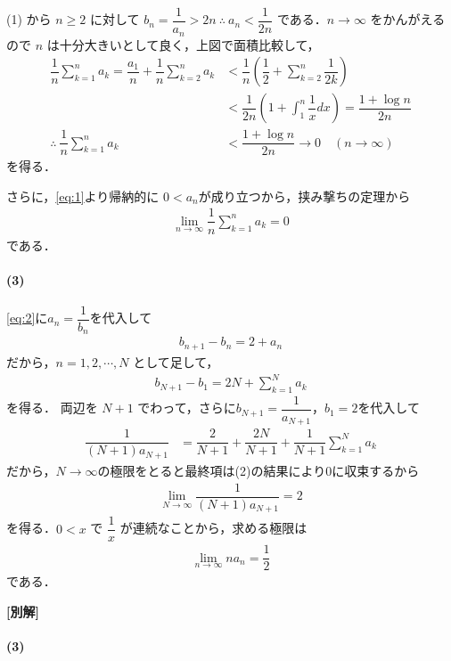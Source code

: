 \documentclass[../../main.tex]{subfiles}
\begin{document}
(1) から $n \ge 2$ に対して $b_n=\dfrac{1}{a_n} > 2n \ \therefore \ a_n < \dfrac{1}{2n}$ である．$n \to \infty$ をかんがえるので $n$ は十分大きいとして良く，上図で面積比較して，
\begin{align}
  \dfrac{1}{n} \sum_{k=1}^n a_k
  = \dfrac{a_1}{n} + \dfrac{1}{n} \sum_{k=2}^n a_k
  &< \dfrac{1}{n} \left( \dfrac{1}{2} + \sum_{k=2}^n \dfrac{1}{2k} \right) \\
  &< \dfrac{1}{2n} \left( 1 + \int_1^n \dfrac{1}{x} dx \right)
  = \dfrac{1+\log n}{2n} \\
  \therefore \ \dfrac{1}{n} \sum_{k=1}^n a_k &< \dfrac{1 + \log n}{2n} \to 0 \quad (n \to \infty)
\end{align}
を得る．

さらに，\cref{eq:1}より帰納的に $0 < a_n$が成り立つから，挟み撃ちの定理から
\begin{align}
  \lim_{n\to\infty} \dfrac{1}{n} \sum_{k=1}^n a_k = 0
\end{align}
である．

\paragraph{(3)}

\cref{eq:2}に$a_n=\dfrac{1}{b_n}$を代入して
\begin{align}
  b_{n+1} - b_n = 2 + a_n
\end{align}
だから，$n=1, 2, \cdots, N$ として足して，
\begin{align}
  b_{N+1} - b_1 = 2N + \sum_{k=1}^N a_k
\end{align}
を得る．
両辺を $N+1$ でわって，さらに$b_{N+1}=\dfrac{1}{a_{N+1}}$，$b_1=2$を代入して
\begin{align}
  \dfrac{1}{(N+1)a_{N+1}} &= \dfrac{2}{N+1} + \dfrac{2N}{N+1} + \dfrac{1}{N+1} \sum_{k=1}^N a_k
\end{align}
だから，$N\to\infty$の極限をとると最終項は(2)の結果により$0$に収束するから
\begin{align}
  \lim_{N \to \infty}\dfrac{1}{(N+1)a_{N+1}} = 2
\end{align}
を得る．$0 < x$ で $\dfrac{1}{x}$ が連続なことから，求める極限は
\begin{align}
  \lim_{n\to\infty} na_n = \dfrac{1}{2}
\end{align}
である．

{\bf [別解]}
\paragraph{(3)}
\end{document}
